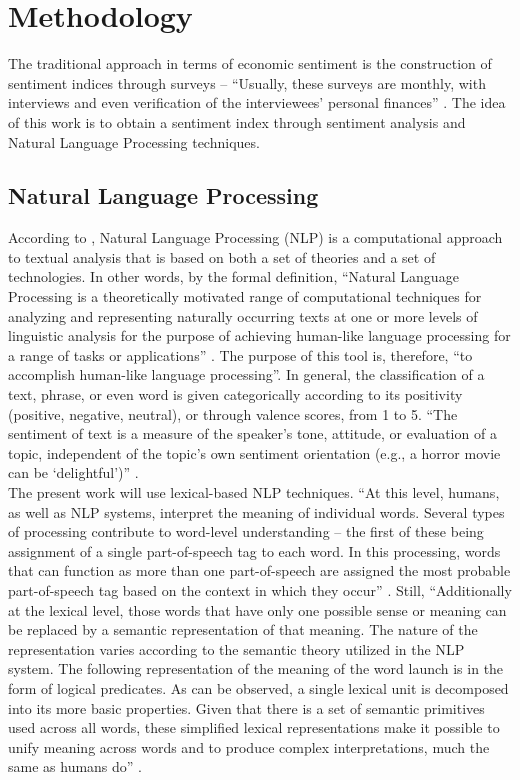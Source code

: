 \chapter{\textbf{Methodology}} \label{cap:methodology}

The traditional approach in terms of economic sentiment is the construction of sentiment indices through surveys \cite[p.4]{shapiro2020measuring} -- ``Usually, these surveys are monthly, with interviews and even verification of the interviewees' personal finances'' \cite[p. 5]{shapiro2020measuring}. The idea of this work is to obtain a sentiment index through sentiment analysis and Natural Language Processing techniques.

\section{Natural Language Processing}

According to \cite{liddy2001natural}, Natural Language Processing (NLP) is a computational approach to textual analysis that is based on both a set of theories and a set of technologies. In other words, by the formal definition, ``Natural Language Processing is a theoretically motivated range of computational techniques for analyzing and representing naturally occurring texts at one or more levels of linguistic analysis for the purpose of achieving human-like language processing for a range of tasks or applications'' \cite[p. 2]{liddy2001natural}. The purpose of this tool is, therefore, ``to accomplish human-like language processing''. In general, the classification of a text, phrase, or even word is given categorically according to its positivity (positive, negative, neutral), or through valence scores, from 1 to 5. ``The sentiment of text is a measure of the speaker's tone, attitude, or evaluation of a topic, independent of the topic's own sentiment orientation (e.g., a horror movie can be `delightful')'' \cite[p. 5]{shapiro2020measuring}.\\

The present work will use lexical-based NLP techniques. ``At this level, humans, as well as NLP systems, interpret the meaning of individual words. Several types of processing contribute to word-level understanding – the first of these being assignment of a single part-of-speech tag to each word. In this processing, words that can function as more than one part-of-speech are assigned the most probable part-of-speech tag based on the context in which they occur'' \cite[p.7]{liddy2001natural}. Still, ``Additionally at the lexical level, those words that have only one possible sense or meaning can be replaced by a semantic representation of that meaning. The nature of the representation varies according to the semantic theory utilized in the NLP system. The following representation of the meaning of the word launch is in the form of logical predicates. As can be observed, a single lexical unit is decomposed into its more basic properties. Given that there is a set of semantic primitives used across all words, these simplified lexical representations make it possible to unify meaning across words and to produce complex interpretations, much the same as humans do'' \cite[p.7]{liddy2001natural}.\\

